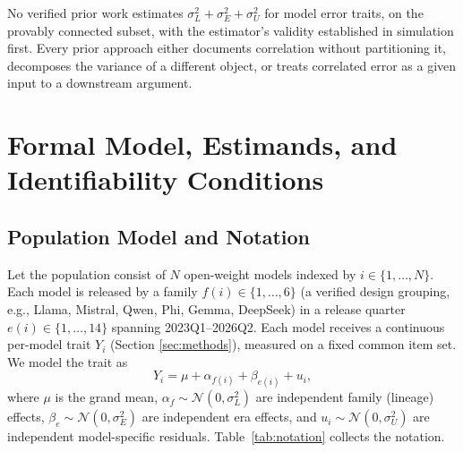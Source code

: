 \documentclass{ieeeaccess}
\theoremstyle{definition}
\theoremstyle{plain}
\begin{document}
No verified prior work estimates $\sigma^{2}_{L}+\sigma^{2}_{E}+\sigma^{2}_{U}$ for
model error traits, on the provably connected subset, with the estimator's validity
established in simulation first. Every prior approach either documents correlation
without partitioning it, decomposes the variance of a different object, or treats
correlated error as a given input to a downstream argument.

\section{Formal Model, Estimands, and Identifiability Conditions}
\label{sec:model}

\subsection{Population Model and Notation}
Let the population consist of $N$ open-weight models indexed by $i\in\{1,\dots,N\}$.
Each model is released by a family $f(i)\in\{1,\dots,6\}$ (a verified design
grouping, e.g., Llama, Mistral, Qwen, Phi, Gemma, DeepSeek) in a release quarter
$e(i)\in\{1,\dots,14\}$ spanning 2023Q1--2026Q2. Each model receives a continuous
per-model trait $Y_{i}$ (Section \ref{sec:methods}), measured on a fixed common
item set. We model the trait as
\begin{equation}
Y_{i} = \mu + \alpha_{f(i)} + \beta_{e(i)} + u_{i},
\label{eq:model}
\end{equation}
where $\mu$ is the grand mean, $\alpha_{f}\sim\mathcal{N}(0,\sigma^{2}_{L})$ are
independent family (lineage) effects, $\beta_{e}\sim\mathcal{N}(0,\sigma^{2}_{E})$
are independent era effects, and $u_{i}\sim\mathcal{N}(0,\sigma^{2}_{U})$ are
independent model-specific residuals. Table~\ref{tab:notation} collects the
notation.
\end{document}
